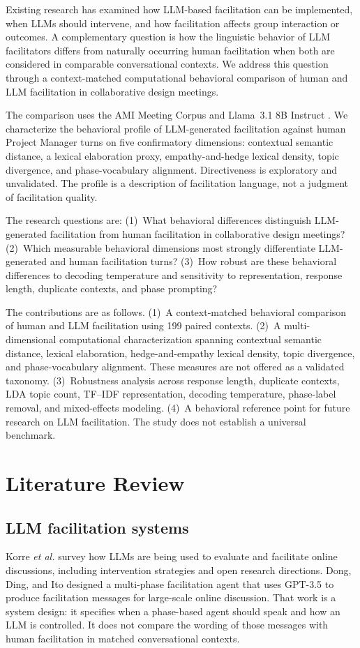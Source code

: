 \documentclass[10pt,journal,compsoc]{IEEEtran}
\begin{document}
Existing research has examined how LLM-based facilitation can be implemented, when LLMs should intervene, and how facilitation affects group interaction or outcomes. A complementary question is how the linguistic behavior of LLM facilitators differs from naturally occurring human facilitation when both are considered in comparable conversational contexts. We address this question through a context-matched computational behavioral comparison of human and LLM facilitation in collaborative design meetings.

The comparison uses the AMI Meeting Corpus \cite{carletta2005ami} and Llama~3.1 8B Instruct \cite{dubey2024llama3}. We characterize the behavioral profile of LLM-generated facilitation against human Project Manager turns on five confirmatory dimensions: contextual semantic distance, a lexical elaboration proxy, empathy-and-hedge lexical density, topic divergence, and phase-vocabulary alignment. Directiveness is exploratory and unvalidated. The profile is a description of facilitation language, not a judgment of facilitation quality.

The research questions are:
(1)~What behavioral differences distinguish LLM-generated facilitation from human facilitation in collaborative design meetings?
(2)~Which measurable behavioral dimensions most strongly differentiate LLM-generated and human facilitation turns?
(3)~How robust are these behavioral differences to decoding temperature and sensitivity to representation, response length, duplicate contexts, and phase prompting?

The contributions are as follows.
(1)~A context-matched behavioral comparison of human and LLM facilitation using 199 paired contexts.
(2)~A multi-dimensional computational characterization spanning contextual semantic distance, lexical elaboration, hedge-and-empathy lexical density, topic divergence, and phase-vocabulary alignment. These measures are not offered as a validated taxonomy.
(3)~Robustness analysis across response length, duplicate contexts, LDA topic count, TF--IDF representation, decoding temperature, phase-label removal, and mixed-effects modeling.
(4)~A behavioral reference point for future research on LLM facilitation. The study does not establish a universal benchmark.

\section{Literature Review}
\subsection{LLM facilitation systems}
Korre \emph{et al.} \cite{korre2025} survey how LLMs are being used to evaluate and facilitate online discussions, including intervention strategies and open research directions. Dong, Ding, and Ito \cite{dong2024facilitation} designed a multi-phase facilitation agent that uses GPT-3.5 to produce facilitation messages for large-scale online discussion. That work is a system design: it specifies when a phase-based agent should speak and how an LLM is controlled. It does not compare the wording of those messages with human facilitation in matched conversational contexts.
\end{document}
